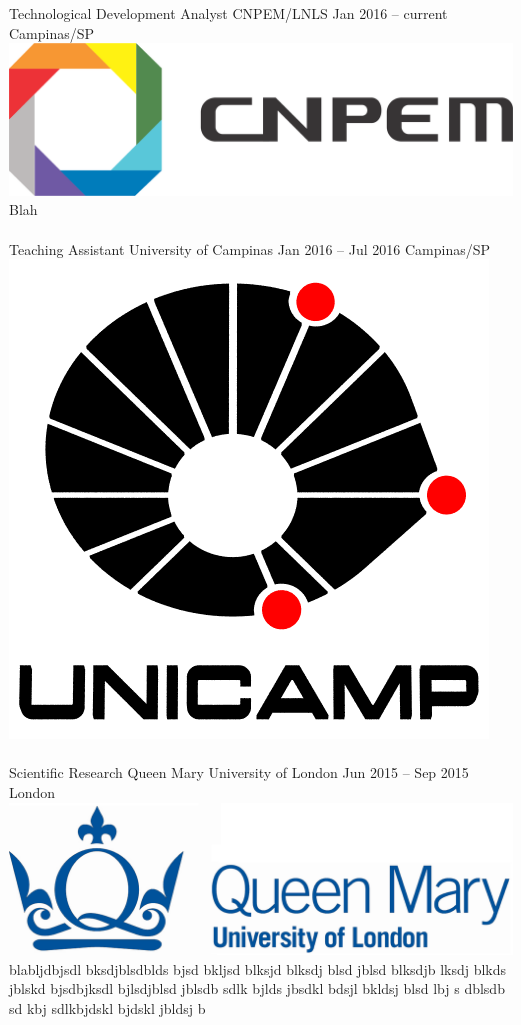 \documentclass[
	a4paper,
]{fortysecondscv}
\newcommand{\profiledivider}{\textcolor{body!30}{\hdashrule{\linewidth}{0.6pt}{0.5ex}}\\}
\begin{document}
\makefrontsidebar

\graphicspath{{../figures/work/}}
    \cvevent
        {Technological Development Analyst}
        {CNPEM/LNLS}
        {Jan 2016 -- current}
        {Campinas/SP}
        {\hspace{2mm}\includegraphics[height=0.07\textwidth]{CNPEM}}
        {Blah}
    \\\profiledivider
    \cvevent
        {Teaching Assistant}
        {University of Campinas}
        {Jan 2016 -- Jul 2016}
        {Campinas/SP}
        {\hspace{2mm}\includegraphics[height=0.07\textwidth]{Unicamp}}
        {\blindtext}
    \\\profiledivider
    \cvevent
        {Scientific Research}
        {Queen Mary University of London}
        {Jun 2015 -- Sep 2015}
        {London}
        {\hspace{2mm}\includegraphics[height=0.07\textwidth]{QMUL}}
        {blabljdbjsdl bksdjblsdblds bjsd bkljsd blksjd blksdj blsd jblsd blksdjb lksdj blkds jblskd bjsdbjksdl bjlsdjblsd jblsdb sdlk bjlds jbsdkl bdsjl bkldsj blsd lbj s dblsdb sd kbj sdlkbjdskl bjdskl jbldsj b}
    \\\profiledivider
\end{document}
